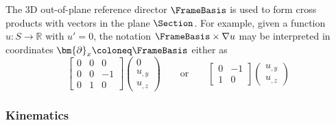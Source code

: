 \begin{remark}
The 3D out-of-plane reference director \(\FrameBasis\) is used to form cross products with vectors in the plane \(\Section\). 
For example, given a function \(u: S \rightarrow \mathbb{R}\) with \(u' = 0\), the notation \(\FrameBasis \times \nabla u\) may be interpreted in coordinates \(\bm{\partial}_x \coloneq \FrameBasis\) either as 
\[
\begin{bmatrix}
0 & 0 & 0 \\
0 & 0 & -1 \\
0 & 1 & 0
\end{bmatrix}
\begin{pmatrix}
0 \\ u_{,y} \\ u_{,z}
\end{pmatrix}
\qquad\text{or}\qquad 
\begin{bmatrix}
0 & -1 \\
1 & 0
\end{bmatrix}
\begin{pmatrix}
u_{,y} \\ u_{,z}
\end{pmatrix}
\]
\end{remark}



\subsubsection{Kinematics}\label{sec:std-kinematics}

